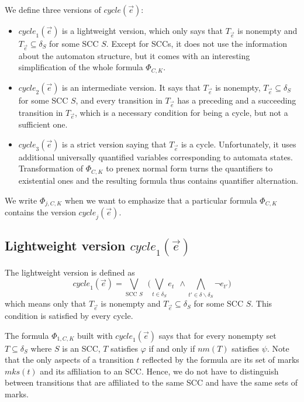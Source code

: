 \documentclass[a4paper,UKenglish,cleveref,autoref,thm-restate]{lipics-v2021}
\newcommand{\mks}{\mathit{mks}}
\newcommand{\rem}{\mathit{nm}}
\newcommand{\mcycle}{\mathit{cycle}}
\newcommand{\Te}{T_{\vec{e}}}
\begin{document}
We define three versions of $\mcycle(\vec{e})$:
\begin{itemize}
\item $\mcycle_1(\vec{e})$ is a lightweight version, which only says
  that $\Te$ is nonempty and $\Te\subseteq\delta_S$ for some SCC $S$.
  Except for SCCs, it does not use the information about the automaton
  structure, but it comes with an interesting simplification of the
  whole formula $\Phi_{C,K}$.
\item $\mcycle_2(\vec{e})$ is an intermediate version. It says that
  $\Te$ is nonempty, $\Te\subseteq\delta_S$ for some SCC $S$, and
  every transition in $\Te$ has %
  a preceding and a succeeding transition in $\Te$, which is a
  necessary condition for being a cycle, but not a sufficient one.
\item $\mcycle_3(\vec{e})$ is a strict version saying that $\Te$ is a
  cycle. Unfortunately, it uses additional universally quantified
  variables corresponding to automata states. Transformation of
  $\Phi_{C,K}$ to prenex normal form turns the quantifiers to
  existential ones and the resulting formula thus contains quantifier
  alternation.
\end{itemize}
We write $\Phi_{j,C,K}$ %
when we want to emphasize
that a particular formula $\Phi_{C,K}$ contains the version
$\mcycle_j(\vec{e})$.

\subsection{Lightweight version $\mcycle_1(\vec{e})$}
The lightweight version is defined as
\[
  \mcycle_1(\vec{e})=\bigvee_{\text{SCC } S}~~\big(\bigvee_{t\in\delta_S}e_t ~~\wedge \bigwedge_{t'\in\delta\smallsetminus\delta_S}\neg e_{t'}\big)
\]
which means only that $\Te$ is nonempty and $\Te\subseteq\delta_S$ for
some SCC $S$.
This condition is satisfied by every cycle.

The formula $\Phi_{1,C,K}$ built with $\mcycle_1(\vec{e})$ says that
for every nonempty set $T\subseteq\delta_S$ where $S$ is an SCC, $T$
satisfies $\varphi$ if and only if $\rem(T)$ satisfies $\psi$. Note
that the only aspects of a transition $t$ reflected by the formula are
its set of marks $\mks(t)$ and its affiliation to an SCC.
Hence, we do not have to distinguish between transitions that are
affiliated to the same SCC and have the same sets of marks.
\end{document}
